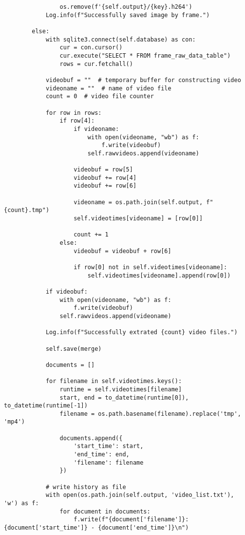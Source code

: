 \documentclass{easychair}
\begin{document}
\begin{enumerate}
\begin{lstlisting}
                os.remove(f'{self.output}/{key}.h264')
            Log.info(f"Successfully saved image by frame.")

        else:
            with sqlite3.connect(self.database) as con:
                cur = con.cursor()
                cur.execute("SELECT * FROM frame_raw_data_table")
                rows = cur.fetchall()

            videobuf = ""  # temporary buffer for constructing video
            videoname = ""  # name of video file
            count = 0  # video file counter

            for row in rows:
                if row[4]:
                    if videoname:
                        with open(videoname, "wb") as f:
                            f.write(videobuf)
                        self.rawvideos.append(videoname)

                    videobuf = row[5]
                    videobuf += row[4]
                    videobuf += row[6]

                    videoname = os.path.join(self.output, f"{count}.tmp")
                    self.videotimes[videoname] = [row[0]]

                    count += 1
                else:
                    videobuf = videobuf + row[6]

                    if row[0] not in self.videotimes[videoname]:
                        self.videotimes[videoname].append(row[0])

            if videobuf:
                with open(videoname, "wb") as f:
                    f.write(videobuf)
                self.rawvideos.append(videoname)

            Log.info(f"Successfully extrated {count} video files.")

            self.save(merge)

            documents = []

            for filename in self.videotimes.keys():
                runtime = self.videotimes[filename]
                start, end = to_datetime(runtime[0]), to_datetime(runtime[-1])
                filename = os.path.basename(filename).replace('tmp', 'mp4')

                documents.append({
                    'start_time': start,
                    'end_time': end,
                    'filename': filename
                })

            # write history as file
            with open(os.path.join(self.output, 'video_list.txt'), 'w') as f:
                for document in documents:
                    f.write(f"{document['filename']}: {document['start_time']} - {document['end_time']}\n")


\end{lstlisting}
\end{enumerate}
\end{document}

